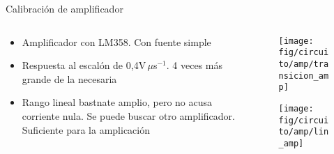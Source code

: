\begin{frame}{Calibración de amplificador}

\begin{columns}[c]
    \begin{column}{0.4\textwidth}
        \begin{itemize}
        \item Amplificador con LM358. Con fuente simple
        \item Respuesta al escalón de 0,4V$\,\mu$s$^{-1}$. 4 veces más grande de la necesaria
        \item Rango lineal bastnate amplio, pero no acusa corriente nula. Se puede buscar otro amplificador. Suficiente para la amplicación
        \end{itemize}
    \end{column}
    \begin{column}{0.5\textwidth}
        \vspace{-1em}
        \begin{figure}[H]
            \centering
            \texttt{[image: fig/circuito/amp/transicion\_amp]}
            \label{fig:transicion_amp}
        \end{figure}
        \vspace{-2em}
        \begin{figure}[H]
            \centering
            \texttt{[image: fig/circuito/amp/lin\_amp]}
            \label{fig:circuito/amp/lin_amp}
        \end{figure}
    \end{column}
\end{columns}


\end{frame}

